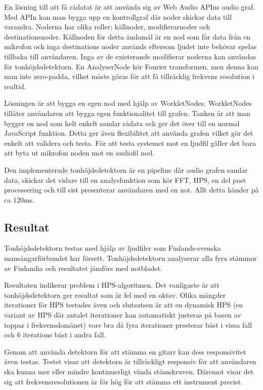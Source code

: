 En lösning till att få rådatat är att använda sig av Web Audio APIns audio graf. Med APIn kan man bygga upp en kontrollgraf där noder skickar data till varandra. Noderna har olika roller; källnoder, modifierarnoder och destinationsnoder. Källnoden för detta ändamål är en nod som får data från en mikrofon och inga destinations noder används eftersom ljudet inte behövar spelas tillbaka till användaren. Inga av de existerande modifierar noderna kan användas för tonhöjdsdetektorn. En AnalyserNode kör Fourier transformen, men denna kan man inte zero-padda, vilket måste göras för att få tillräcklig frekvens resolution i realtid. 

Lösningen är att bygga en egen nod med hjälp av WorkletNodes. WorkletNodes tillåter användaren att bygga egen funktionalitet till grafen. Tanken är att man bygger en nod som helt enkelt samlar rådata och ger det över till en normal JavaScript funktion. Detta ger även flexibilitet att använda grafen vilket gör det enkelt att validera och testa. För att testa systemet mot en ljudfil gäller det bara att byta ut mikrofon noden mot en audiofil nod.  

Den implementerade tonhöjdsdetektorn är en pipeline där audio grafen samlar data, skickar det vidare till en analysfunktion som kör FFT, HPS, en del post processering och till sist presenterar användaren med en not. Allt detta händer på ca 120ms. 

\subsection*{Resultat}
Tonhöjdsdetektorn testas med hjälp av ljudfiler som Finlands-svenska mansångarförbundet har försett. Tonhöjdsdetektorn analyserar alla fyra stämmor av Finlandia och resultatet jämförs med notbladet. 

Resultaten indikerar problem i HPS-algoritmen. Det vanligaste är att tonhöjdsdetektorn ger resultat som är fel med en oktav. Olika mängder iterationer för HPS testades även och slutsatsen är att en dynamisk HPS (en variant av HPS där antalet iterationer kan automatiskt justeras på basen av toppar i frekvensdomänet) vore bra då fyra iterationer presterar bäst i vissa fall och 6 iterations bäst i andra fall.

Genom att använda detektorn för att stämma en gitarr kan dess responsivitet även testas. Testet visar att detektorn är tillräckligt responsiv för att användaren ska kunna mer eller mindre kontinuerligt vända stämskruven. Däremot visar det sig att frekvensresolutionen är för hög för att stämma ett instrument precist. 


